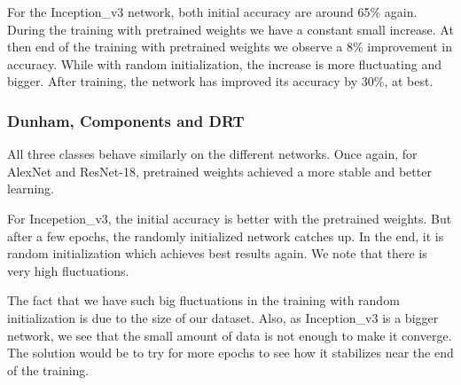 For the Inception\_v3 network, both initial accuracy are around 65\% again. During the training with pretrained weights we have a constant small increase. At then end of the training with pretrained weights we observe a 8\% improvement in accuracy. While with random initialization, the increase is more fluctuating and bigger. After training, the network has improved its accuracy by 30\%, at best.

\subsubsection{Dunham, Components and DRT}
All three classes behave similarly on the different networks. Once again, for AlexNet and ResNet-18, pretrained weights achieved a more stable and better learning. 

For Incepetion\_v3, the initial accuracy is better with the pretrained weights. But after a few epochs, the randomly initialized network catches up. In the end, it is random initialization which achieves best results again. We note that there is very high fluctuations. 

The fact that we have such big fluctuations in the training with random initialization is due to the size of our dataset. Also, as Inception\_v3 is a bigger network, we see  that the small amount of data is not enough to make it converge. The solution would be to try for more epochs to see how it stabilizes near the end of the training. 

